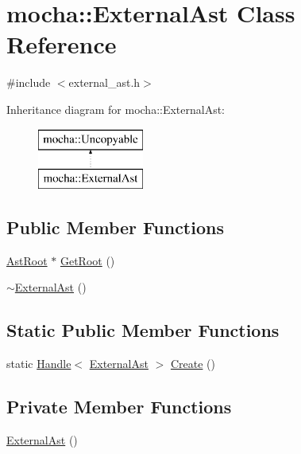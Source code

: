 \hypertarget{classmocha_1_1_external_ast}{
\section{mocha::ExternalAst Class Reference}
\label{classmocha_1_1_external_ast}
}


{\ttfamily \#include $<$external\_\-ast.h$>$}

Inheritance diagram for mocha::ExternalAst:\begin{figure}[H]
\begin{center}
\leavevmode
\includegraphics[height=2.000000cm]{classmocha_1_1_external_ast}
\end{center}
\end{figure}
\subsection*{Public Member Functions}
\begin{DoxyCompactItemize}
\item 
\hyperlink{classmocha_1_1_ast_root}{AstRoot} $\ast$ \hyperlink{classmocha_1_1_external_ast_a283942660cfc16932b02d8b312ee3b8e}{GetRoot} ()
\item 
\hyperlink{classmocha_1_1_external_ast_ab2368ae9cc9d4d10126c87450d7c53f8}{$\sim$ExternalAst} ()
\end{DoxyCompactItemize}
\subsection*{Static Public Member Functions}
\begin{DoxyCompactItemize}
\item 
static \hyperlink{classmocha_1_1_handle}{Handle}$<$ \hyperlink{classmocha_1_1_external_ast}{ExternalAst} $>$ \hyperlink{classmocha_1_1_external_ast_ab38f99ba98a9923eeffab02558f72abc}{Create} ()
\end{DoxyCompactItemize}
\subsection*{Private Member Functions}
\begin{DoxyCompactItemize}
\item 
\hyperlink{classmocha_1_1_external_ast_acc5e9bb8070803d84978276ea576fe96}{ExternalAst} ()
\end{DoxyCompactItemize}
